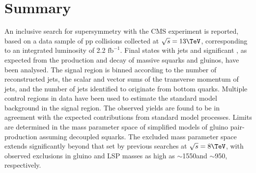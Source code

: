 \clearpage
\section{Summary}
\label{sec:summary}

An inclusive search for supersymmetry with the CMS experiment is
reported, based on a data sample of pp collisions collected at
$\sqrt{s} = 13\TeV$, corresponding to an integrated luminosity of 2.2 $\mathrm{fb}^{-1}$. 
Final states with jets and significant \ETmiss, as
expected from the production and decay of massive squarks and gluinos,
have been analysed. The signal region is binned according to the
number of reconstructed jets, the scalar and vector sums of the
transverse momentum of jets, and the number of jets identified to
originate from bottom quarks. 
Multiple control regions in data have been used to estimate the standard model background in 
the signal region. 
The observed yields are found to be in agreement with the
expected contributions from standard model processes. Limits are
determined in the mass parameter space of simplified models of gluino
pair-production assuming decoupled squarks. The excluded mass
parameter space extends significantly beyond that set by previous
searches at $\sqrt{s} = 8\TeV$, with observed exclusions in gluino and
LSP masses as high as $\sim$1550\gev and $\sim$950\gev, respectively.

